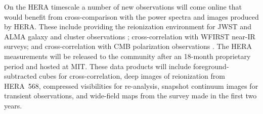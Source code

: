 \documentclass[preprint]{aastex}
\begin{document}
\vspace{5 pt}
On the HERA timescale a number of new observations will come online that would
benefit from cross-comparison with the power spectra and images produced by
HERA. 
These include providing the reionization environment for JWST and ALMA
galaxy and cluster observations \citep{gong_et_al2011}; cross-correlation with WFIRST near-IR surveys;
and cross-correlation with CMB polarization observations \citep{tashiro_et_al2010}. The HERA measurements
will be released to the community after an 18-month proprietary period and
hosted at MIT. These data products will include foreground-subtracted cubes for
cross-correlation, deep images of reionization from HERA~568, compressed
visibilities for re-analysis, snapshot continuum images for transient
observations, and wide-field maps from the survey made in the first two years.
\end{document}
